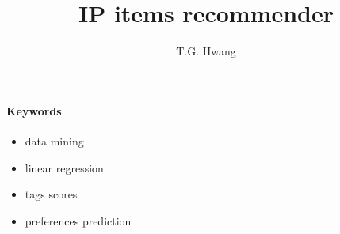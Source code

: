 \documentclass{article}
\begin{document}
\title{IP items recommender}
\author{T.G. Hwang}
\maketitle

\paragraph{Keywords}
\begin{itemize}
    \item data mining
    \item linear regression
    \item tags scores
    \item preferences prediction
\end{itemize}

\tableofcontents \clearpage \newpage

\clearpage \newpage

\end{document}
